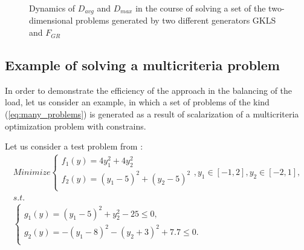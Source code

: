 \documentclass[runningheads]{llncs}
\begin{document}
\begin{figure}[ht]
    \centering
    \caption{Dynamics of \(D_{avg}\) and \(D_{max}\) in the course of solving a set of the two-
dimensional problems generated by two different generators GKLS and \(F_{GR}\)}
    \label{fig:devs_mixed}
\end{figure}

\subsection{Example of solving a multicriteria problem}

In order to demonstrate the efficiency of the approach in the balancing of the load, let us
consider an example, in which a set of problems of the kind (\ref{eq:many_problems}) is
generated as a result of scalarization of a multicriteria optimization problem with constrains.

Let us consider a test problem from \cite{BinhKorn1999}:
\begin{equation}
  \label{eq:mco_probem}
  \begin{array}{l}
      Minimize \left \{
      \begin{array}{l}
        f_1(y) = 4 y_1^2 + 4 y_2^2 \\
        f_2(y) = (y_1-5)^2 + (y_2-5)^2 \\
      \end{array}
      \right .
      , y_1\in [-1,2],y_2\in [-2,1],
      \\s.t.
      \\
      \left \{
      \begin{array}{l}
        g_1(y) = (y_1 - 5)^2 + y_2^2 - 25 \leqslant 0, \\
        g_2(y) = -(y_1 - 8)^2 - (y_2 + 3)^2 + 7.7 \leqslant 0.\\
      \end{array}
      \right .
  \end{array}
\end{equation}
\end{document}
